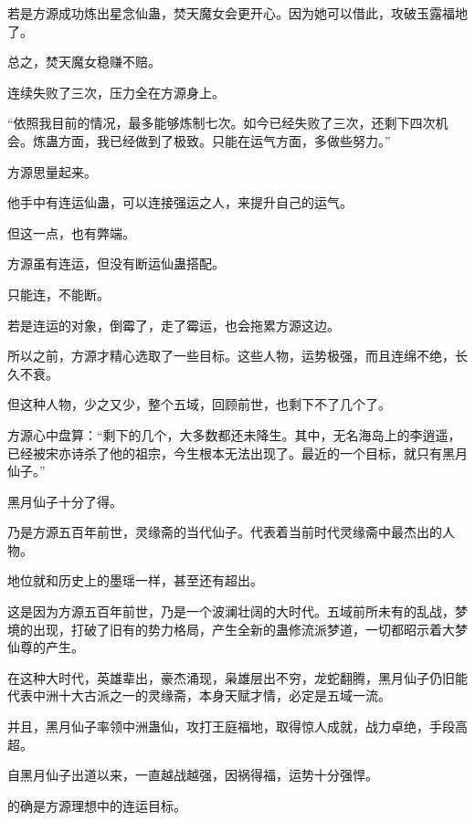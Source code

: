 \begin{this_body}
若是方源成功炼出星念仙蛊，焚天魔女会更开心。因为她可以借此，攻破玉露福地了。

总之，焚天魔女稳赚不赔。

连续失败了三次，压力全在方源身上。

“依照我目前的情况，最多能够炼制七次。如今已经失败了三次，还剩下四次机会。炼蛊方面，我已经做到了极致。只能在运气方面，多做些努力。”

方源思量起来。

他手中有连运仙蛊，可以连接强运之人，来提升自己的运气。

但这一点，也有弊端。

方源虽有连运，但没有断运仙蛊搭配。

只能连，不能断。

若是连运的对象，倒霉了，走了霉运，也会拖累方源这边。

所以之前，方源才精心选取了一些目标。这些人物，运势极强，而且连绵不绝，长久不衰。

但这种人物，少之又少，整个五域，回顾前世，也剩下不了几个了。

方源心中盘算：“剩下的几个，大多数都还未降生。其中，无名海岛上的李逍遥，已经被宋亦诗杀了他的祖宗，今生根本无法出现了。最近的一个目标，就只有黑月仙子。”

黑月仙子十分了得。

乃是方源五百年前世，灵缘斋的当代仙子。代表着当前时代灵缘斋中最杰出的人物。

地位就和历史上的墨瑶一样，甚至还有超出。

这是因为方源五百年前世，乃是一个波澜壮阔的大时代。五域前所未有的乱战，梦境的出现，打破了旧有的势力格局，产生全新的蛊修流派梦道，一切都昭示着大梦仙尊的产生。

在这种大时代，英雄辈出，豪杰涌现，枭雄层出不穷，龙蛇翻腾，黑月仙子仍旧能代表中洲十大古派之一的灵缘斋，本身天赋才情，必定是五域一流。

并且，黑月仙子率领中洲蛊仙，攻打王庭福地，取得惊人成就，战力卓绝，手段高超。

自黑月仙子出道以来，一直越战越强，因祸得福，运势十分强悍。

的确是方源理想中的连运目标。

\end{this_body}

